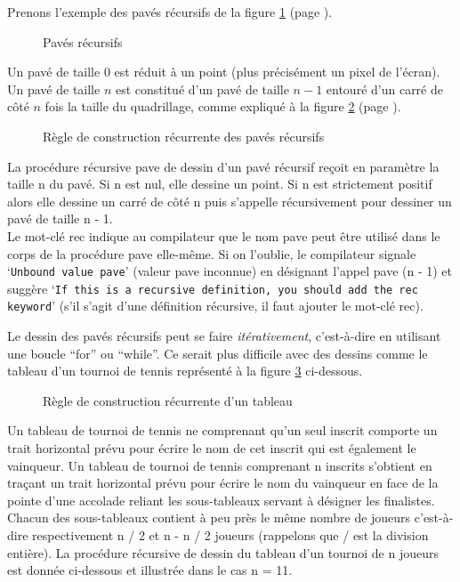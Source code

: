 Prenons l'exemple des pavés récursifs
de la figure \ref{fig:pavec} (page \pageref{fig:pavec}).
\begin{figure}[htbp]
 \caption{Pavés récursifs}\label{fig:pavec}
\end{figure}
Un pavé de taille 0 est réduit à un point (plus précisément un pixel de l'écran).
Un pavé de taille $n$ est constitué d'un pavé de taille $n - 1$
entouré d'un carré de côté $n$ fois la taille du quadrillage, comme expliqué à la
figure \ref{fig:indpavec} (page \pageref{fig:indpavec}).
\begin{figure}[htbp]
 \caption{Règle de construction récurrente des pavés récursifs}\label{fig:indpavec}
\end{figure}
La procédure récursive {\idt pave} de dessin d'un pavé récursif reçoit en paramètre la taille {\idt n}
du pavé. Si {\idt n} est nul, elle dessine un point. Si {\idt n} est strictement positif alors
elle dessine un carré de côté {\idt n} puis s'appelle récursivement pour dessiner un
pavé de taille {\idt n - 1}.
\ \\

\noindent Le mot-clé {\mcl rec} indique au compilateur que le nom {\idt pave} peut être
utilisé dans le corps de la procédure {\idt pave} elle-même. Si on l'oublie, le compilateur
signale `{\tt Unbound value pave}' (valeur {\idt pave} inconnue) en désignant l'appel
{\idt pave (n - 1)} et suggère `{\tt If this is a recursive definition, you should add the rec
keyword}' (s'il s'agit d'une définition récursive, il faut ajouter le mot-clé {\mcl rec}).


Le dessin des pavés récursifs peut se faire {\em itérativement}, c'est-à-dire en utilisant 
une boucle ``for'' ou ``while''. Ce serait plus difficile avec des dessins comme le tableau d'un tournoi
de tennis représenté à la figure \ref{fig:tabtour} ci-dessous.
\begin{figure}[htbp]
 \caption{Règle de construction récurrente d'un tableau\label{fig:tabtour}}
\end{figure}

Un tableau de tournoi de tennis ne comprenant qu'un seul inscrit comporte un trait horizontal
prévu pour écrire le nom de cet inscrit qui est également le vainqueur. Un tableau de tournoi de 
tennis comprenant {\idt n} ins\-crits s'obtient en traçant un trait horizontal
prévu pour écrire le nom du vainqueur en face de la pointe d'une accolade reliant les 
sous-tableaux servant à désigner les finalistes. Chacun des sous-tableaux contient à peu près
le même nombre de joueurs c'est-à-dire respectivement {\idt n / 2} et
{\idt n - n / 2} joueurs (rappelons que {\idt /} est la division entière). La procédure récursive de dessin du tableau d'un 
tournoi de {\idt n} joueurs est donnée ci-dessous et illustrée dans le cas {\idt n = 11}.

